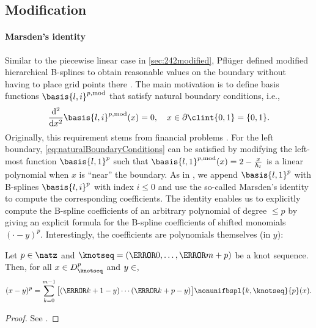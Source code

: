 \subsection{Modification}
\label{sec:313modification}

\paragraph{Marsden's identity}

Similar to the piecewise linear case in \cref{sec:242modified},
Pflüger defined modified
hierarchical B-splines to obtain reasonable values on the boundary
without having to place grid points there \cite{Pflueger10Spatially}.
The main motivation is to define basis
functions $\basis{l,i}^{p,\modified}$ that satisfy natural boundary
conditions, i.e.,
\begin{equation}
  \label{eq:naturalBoundaryConditions}
  \frac{\diff^2}{\dx^2} \basis{l,i}^{p,\modified}(x) = 0,\quad
  x \in \bndrydomain{\clint{0, 1}} = \{0, 1\}.
\end{equation}
Originally, this requirement stems from financial problems
\cite{Pflueger10Spatially}.
For the left boundary,
\eqref{eq:naturalBoundaryConditions} can be satisfied by
modifying the left-most function $\basis{l,1}^p$ such that
$\basis{l,1}^{p,\modified}(x) = 2 - \tfrac{x}{\ms{l}}$ is a linear polynomial
when $x$ is ``near'' the boundary.
As in \cite{Pflueger10Spatially},
we append $\basis{l,1}^p$ with
B-splines $\basis{l,i}^p$ with index $i \le 0$ and
use the so-called Marsden's identity to compute the corresponding
coefficients.
The identity enables us to explicitly compute the B-spline coefficients
of an arbitrary polynomial of degree $\le p$ by giving an explicit formula
for the B-spline coefficients of shifted monomials $({\cdot} - y)^p$.
Interestingly, the coefficients are polynomials themselves (in $y$):

\begin{lemma}
  \label{lemma:marsden}
  Let $p \in \natz$ and
  $\knotseq = (\knot{0}, \dotsc, \knot{m+p})$ be a knot sequence.
  Then, for all $x \in D_\knotseq^p$ and $y \in \real$,
  \begin{equation}
    \label{eq:marsden}
    (x - y)^p
    = \sum_{k=0}^{m-1} \big[(\knot{k+1} - y) \dotsm (\knot{k+p} - y)\big]
    \nonunifbspl{k,\knotseq}{p}(x).
  \end{equation}
\end{lemma}

\begin{proof}
  See \cite{Hoellig13Approximation}.
\end{proof}

